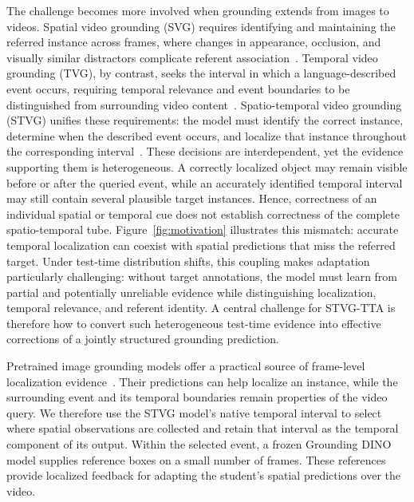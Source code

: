 \documentclass[10pt,twocolumn,letterpaper]{article}
\begin{document}
The challenge becomes more involved when grounding extends from
images to videos. Spatial video grounding (SVG) requires identifying
and maintaining the referred instance across frames, where changes
in appearance, occlusion, and visually similar distractors complicate
referent association~\cite{tempcd}. Temporal video grounding (TVG),
by contrast, seeks the interval in which a language-described event
occurs, requiring temporal relevance and event boundaries to be
distinguished from surrounding video content~\cite{videoopd}.
Spatio-temporal video grounding (STVG) unifies these requirements:
the model must identify the correct instance, determine when the
described event occurs, and localize that instance throughout the
corresponding interval~\cite{vidstg,tubedetr,e3m}. These decisions
are interdependent, yet the evidence supporting them is heterogeneous.
A correctly localized object may remain visible before or after the
queried event, while an accurately identified temporal interval may
still contain several plausible target instances. Hence, correctness
of an individual spatial or temporal cue does not establish
correctness of the complete spatio-temporal tube.
Figure~\ref{fig:motivation} illustrates this mismatch: accurate temporal
localization can coexist with spatial predictions that miss the referred target.
Under test-time
distribution shifts, this coupling makes adaptation particularly
challenging: without target annotations, the model must learn from
partial and potentially unreliable evidence while distinguishing
localization, temporal relevance, and referent identity. A central
challenge for STVG-TTA is therefore how to convert such heterogeneous
test-time evidence into effective corrections of a jointly structured
grounding prediction.


Pretrained image grounding models offer a practical source of
frame-level localization evidence~\cite{groundingdino}. Their
predictions can help localize an instance, while the surrounding
event and its temporal boundaries remain properties of the video
query. We therefore use the STVG model's native temporal interval to
select where spatial observations are collected and retain that
interval as the temporal component of its output. Within the selected
event, a frozen Grounding DINO model supplies reference boxes on a
small number of frames. These references provide localized feedback
for adapting the student's spatial predictions over the video.
\end{document}
